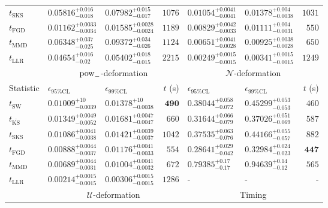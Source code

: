 \begin{tabular}{l|llr|llr}
	$t_{\mathrm{SKS}}$ & $0.05816_{-0.018}^{+0.016}$ & $0.07982_{-0.017}^{+0.015}$ & $1076$ & $0.01054_{-0.0041}^{+0.0041}$ & $0.01378_{-0.0038}^{+0.004}$ & $1031$ \\
	$t_{\mathrm{FGD}}$ & ${\mathbf{0.01162_{-0.0034}^{+0.0033}}}$ & ${\mathbf{0.01585_{-0.0024}^{+0.0028}}}$ & $1189$ & $0.00829_{-0.0033}^{+0.0042}$ & $0.01111_{-0.0031}^{+0.004}$ & $550$ \\
	$t_{\mathrm{MMD}}$ & $0.06348_{-0.025}^{+0.037}$ & $0.09372_{-0.026}^{+0.034}$ & $1124$ & ${\mathbf{0.00651_{-0.0028}^{+0.0041}}}$ & ${\mathbf{0.00925_{-0.0028}^{+0.0038}}}$ & $650$ \\
	$t_{\mathrm{LLR}}$ & $0.04654_{-0.02}^{+0.016}$ & $0.05402_{-0.015}^{+0.018}$ & $2215$ & $0.00249_{-0.0015}^{+0.0015}$ & $0.00341_{-0.0015}^{+0.0015}$ & $1249$ \\
	\toprule
	\multicolumn{1}{c}{} & \multicolumn{3}{c}{$\rm{pow}_{-}$-deformation} & \multicolumn{3}{c}{$\mathcal{N}$-deformation} \\
	Statistic & $\epsilon_{95\%\mathrm{CL}}$ & $\epsilon_{99\%\mathrm{CL}}$ & $t$ (s) & $\epsilon_{95\%\mathrm{CL}}$ & $\epsilon_{99\%\mathrm{CL}}$ & $t$ (s) \\
	\midrule
	$t_{\mathrm{SW}}$ & $0.01009_{-0.0039}^{+10}$ & $0.01378_{-0.0038}^{+10}$ & ${\mathbf{490}}$ & $0.38044_{-0.072}^{+0.058}$ & $0.45299_{-0.053}^{+0.053}$ & $460$ \\
	$t_{\overline{\mathrm{KS}}}$ & $0.01349_{-0.0052}^{+0.0049}$ & $0.01681_{-0.0047}^{+0.0047}$ & $660$ & $0.31644_{-0.079}^{+0.066}$ & $0.37026_{-0.069}^{+0.051}$ & $587$ \\
	$t_{\mathrm{SKS}}$ & $0.01086_{-0.0038}^{+0.0041}$ & $0.01421_{-0.0037}^{+0.0039}$ & $1042$ & $0.37535_{-0.076}^{+0.063}$ & $0.44166_{-0.057}^{+0.055}$ & $882$ \\
	$t_{\mathrm{FGD}}$ & $0.00888_{-0.0037}^{+0.0044}$ & $0.01176_{-0.0033}^{+0.0041}$ & $554$ & ${\mathbf{0.28641_{-0.042}^{+0.029}}}$ & ${\mathbf{0.32984_{-0.023}^{+0.024}}}$ & ${\mathbf{447}}$ \\
	$t_{\mathrm{MMD}}$ & ${\mathbf{0.00689_{-0.0031}^{+0.0044}}}$ & ${\mathbf{0.01004_{-0.0032}^{+0.0041}}}$ & $672$ & $0.79385_{-0.17}^{+0.17}$ & $0.94639_{-0.12}^{+0.14}$ & $565$ \\
	$t_{\mathrm{LLR}}$ & $0.00214_{-0.0015}^{+0.0015}$ & $0.00306_{-0.0015}^{+0.0015}$ & $1286$ & - & - & - \\
	\toprule
	\multicolumn{1}{c}{} & \multicolumn{3}{c}{$\mathcal{U}$-deformation} & \multicolumn{3}{c}{Timing} \\

\end{tabular}
